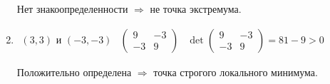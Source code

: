 \begin{example}
\begin{enumerate}
        Нет знакоопределенности $\Rightarrow$ не точка экстремума.
        \item $\begin{array}{lll}
             (3, 3) \text{ и } (-3, -3)& \begin{pmatrix}
                   9 & -3 \\
                   -3 & 9
             \end{pmatrix} & 
             \det \begin{pmatrix}
                   9 & -3 \\
                   -3 & 9
             \end{pmatrix} = 81-9 > 0
                \end{array}$

        Положительно определена $\Rightarrow$ точка строгого локального минимума.
    \end{enumerate}
\end{example}
    
